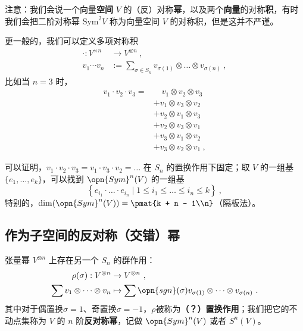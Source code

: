 注意：我们会说一个向量\textbf{空间} $V$ 的（反）对称\textbf{幂}，以及两个\textbf{向量}的对称\textbf{积}，有时我们会把二阶对称幂 $\text{Sym}^2 V$ 称为向量空间 $V$ 的对称积，但是这并不严谨。

更一般的，我们可以定义多项对称积
\begin{equation}
\begin{aligned}
\cdot: V^{\times n} &\to V^{\otimes n}~, \\
v_1 \cdots v_n &:= \sum_{\sigma \in S_n} v_{\sigma(1)} \otimes \dots \otimes v_{\sigma(n)}~,
\end{aligned}
\end{equation}
比如当 $n = 3$ 时，
\begin{equation}
\begin{aligned}
v_1 \cdot v_2 \cdot v_3 = &\quad v_1 \otimes v_2 \otimes v_3 \\
&+ v_1 \otimes v_3 \otimes v_2 \\
&+ v_2 \otimes v_1 \otimes v_3 \\
&+ v_2 \otimes v_3 \otimes v_1 \\
&+ v_3 \otimes v_1 \otimes v_2 \\
&+ v_3 \otimes v_2 \otimes v_1~,
\end{aligned}
\end{equation}

可以证明，$v_1 \cdot v_2 \cdot v_3 = v_1 \cdot v_3 \cdot v_2 = \dots$ 在 $S_n$ 的置换作用下固定；取 $V$ 的一组基 $\{e_1, \dots, e_k\}$，可以找到 $\opn{Sym}^n(V)$ 的一组基
\begin{equation}
\left\{ e_{i_1} \cdot \dots \cdot e_{i_n} \mid 1 \leq i_1 \leq \dots \leq i_n \leq k \right\}~,
\end{equation}
特别的，$\dim(\opn{Sym}^n(V)) = \pmat{k + n - 1\\n}$（隔板法）。

\subsection{作为子空间的反对称（交错）幂}

张量幂 $V^{\otimes n}$ 上存在另一个 $S_n$ 的群作用：
\begin{equation}
\begin{aligned}
\rho(\sigma): V^{\otimes n} &\to V^{\otimes n}~, \\
\sum v_1 \otimes \dots \otimes v_n &\mapsto \sum \opn{sgn}(\sigma) v_{\sigma(1)} \otimes \dots \otimes v_{\sigma(n)}~.
\end{aligned}
\end{equation}
其中对于偶置换$\sigma = 1$、奇置换$\sigma = -1$，$\rho$被称为\textbf{（？）置换作用}；我们把它的不动点集称为 $V$ 的 $n$ 阶\textbf{反对称幂}，记做 $\opn{Sym}^n(V)$ 或者 $S^n(V)$。

